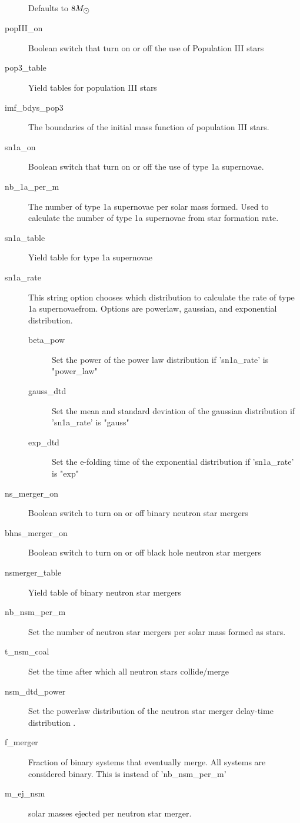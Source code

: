 \begin{description}
  Defaults to $8\msol$
\item[popIII\_on] Boolean switch that turn on or off the use of Population III stars
\item[pop3\_table] Yield tables for population III stars
\item[imf\_bdys\_pop3] The boundaries of the initial mass function of population III stars.
\item[sn1a\_on] Boolean switch that turn on or off the use of type 1a supernovae.
\item[nb\_1a\_per\_m] The number of type 1a supernovae per solar mass formed.
  Used to calculate the number of type 1a supernovae from star formation rate.
\item[sn1a\_table] Yield table for type 1a supernovae
\item[sn1a\_rate] This string option chooses which distribution to calculate the rate of type 1a supernovaefrom.
  Options are powerlaw, gaussian, and exponential distribution.
  \begin{description}
  \item[beta\_pow] Set the power of the power law distribution if 'sn1a\_rate' is "power\_law" 
  \item[gauss\_dtd] Set the mean and standard deviation of the gaussian distribution if 'sn1a\_rate' is "gauss" 
  \item[exp\_dtd] Set the e-folding time of the exponential distribution if 'sn1a\_rate' is "exp"
  \end{description}
\item[ns\_merger\_on] Boolean switch to turn on or off binary neutron star mergers
\item[bhns\_merger\_on] Boolean switch to turn on or off black hole neutron star mergers
\item[nsmerger\_table] Yield table of binary neutron star mergers
\item[nb\_nsm\_per\_m] Set the number of neutron star mergers per solar mass formed as stars.
\item[t\_nsm\_coal] Set the time after which all neutron stars collide/merge
\item[nsm\_dtd\_power] Set the powerlaw distribution of the neutron star merger delay-time distribution .
\item[f\_merger] Fraction of binary systems that eventually merge. All systems are considered binary. This is instead of 'nb\_nsm\_per\_m'
\item[m\_ej\_nsm] solar masses ejected per neutron star merger.
\end{description}
